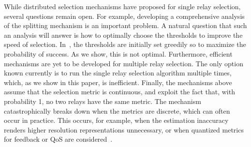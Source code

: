 \documentclass[12pt,draftcls,peerreview, onecolumn]{IEEEtran}
\begin{document}
While distributed selection mechanisms have proposed for single relay
selection, several questions remain open. For example, developing a
comprehensive analysis of the splitting mechanism is an important
problem. A natural question that such an analysis will answer is how
to optimally choose the thresholds to improve the speed of selection.
In~\cite{qin_infocomm_2004}, the thresholds are initially set greedily
so to maximize the probability of success. As we show, this is not
optimal. Furthermore, efficient mechanisms are yet to be developed for
multiple relay selection. The only option known currently is to run
the single relay selection algorithm multiple times, which, as we show
in this paper, is inefficient. Finally, the mechanisms above assume
that the selection metric is continuous, and exploit the fact that,
with probability 1, no two relays have the same metric. The mechanism
catastrophically breaks down when the metrics are discrete, which can
often occur in practice.  This occurs, for example, when the
estimation inaccuracy renders higher resolution representations
unnecessary, or when quantized metrics for feedback or QoS are
considered~\cite{lo_VT_2009_HARQ,choumas_LANMAN}.
\end{document}
